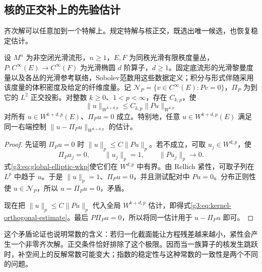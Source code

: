 \subsection{核的正交补上的先验估计}
\label{g3:subsec:1301:04}
齐次解可以任意加到一个特解上。规定特解与核正交，既选出唯一候选，也恢复稳定估计。

\begin{theorem}\label{g3:thm:kernel-orthogonal-estimate}
	设 \(M^n\) 为非空闭光滑流形，\(n\ge1\)，\(E,F\) 为同秩光滑有限秩度量丛，\(P:C^\infty(E)\to C^\infty(F)\) 为光滑椭圆 \(d\) 阶算子，\(d\ge1\)。固定底流形的光滑黎曼度量以及各丛的光滑参考联络，Sobolev范数用这些数据定义；积分与形式伴随采用该度量的体积密度及给定的纤维度量。记 \(\mathcal N_P=\{v\in C^\infty(E):Pv=0\}\)，\(\Pi_P\) 为到它的 \(L^2\) 正交投影。对整数 \(k\ge0\)、\(1<p<\infty\)，存在 \(C_{k,p}\)，使
	\begin{equation}\label{g3:eq:kernel-orthogonal-estimate}
		\|u\|_{W^{k+d,p}}\le C_{k,p}\|Pu\|_{W^{k,p}}
	\end{equation}
	对所有 \(u\in W^{k+d,p}(E)\)、\(\Pi_Pu=0\) 成立。特别地，任意 \(u\in W^{k+d,p}(E)\) 满足同一右端控制 \(\|u-\Pi_Pu\|_{W^{k+d,p}}\) 的估计。
\end{theorem}
\begin{proof}
	先证明 \(\Pi_Pu=0\) 时 \(\|u\|_p\le C\|Pu\|_p\)。若不成立，可取 \(u_j\in W^{d,p}\)，使
	\[
		\Pi_Pu_j=0,\qquad \|u_j\|_p=1,\qquad \|Pu_j\|_p\longrightarrow0.
	\]
	式\eqref{g3:eq:global-elliptic-wkp}使它们在 \(W^{d,p}\) 中有界。由 Rellich 紧性，可取子列在 \(L^p\) 中趋于 \(u\)。于是 \(\|u\|_p=1\)、\(\Pi_Pu=0\)，并且测试配对中 \(Pu=0\)。分布正则性使 \(u\in\mathcal N_P\)，所以 \(u=\Pi_Pu=0\)，矛盾。

	现在把 \(\|u\|_p\le C\|Pu\|_p\) 代入全局 \(W^{k+d,p}\) 估计，即得式\eqref{g3:eq:kernel-orthogonal-estimate}。最后 \(P\Pi_Pu=0\)，所以将同一估计用于 \(u-\Pi_Pu\) 即可。
\end{proof}

这个矛盾论证也说明常数的含义：若归一化截面能让方程残差越来越小，紧性会产生一个非零齐次解。正交条件恰好排除了这个极限。因而当一族算子的核发生跳跃时，补空间上的反解常数可能变大；指数的稳定性与这种常数的一致性是两个不同的问题。
